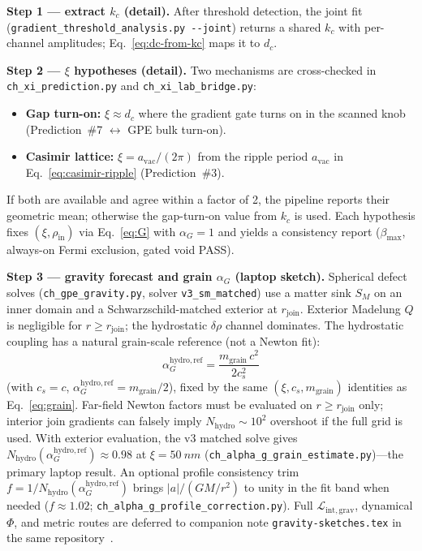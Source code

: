 \documentclass[11pt,a4paper]{article}
\newcommand{\py}[1]{\nolinkurl{#1}}
\begin{document}
\textbf{Step 1 --- extract $k_c$ (detail).}
After threshold detection, the joint fit (\py{gradient_threshold_analysis.py --joint}) returns a shared $k_c$ with per-channel amplitudes; Eq.~\ref{eq:dc-from-kc} maps it to $d_c$.

\textbf{Step 2 --- $\xi$ hypotheses (detail).}
Two mechanisms are cross-checked in \texttt{ch\_xi\_prediction.py} and \texttt{ch\_xi\_lab\_bridge.py}:
\begin{itemize}[leftmargin=*]
  \item \textbf{Gap turn-on:} $\xi \approx d_c$ where the gradient gate turns on in the scanned knob (Prediction~\#7 $\leftrightarrow$ GPE bulk turn-on).
  \item \textbf{Casimir lattice:} $\xi = a_{\mathrm{vac}}/(2\pi)$ from the ripple period $a_{\mathrm{vac}}$ in Eq.~\ref{eq:casimir-ripple} (Prediction~\#3).
\end{itemize}
If both are available and agree within a factor of 2, the pipeline reports their geometric mean; otherwise the gap-turn-on value from $k_c$ is used.
Each hypothesis fixes $(\xi, \rho_{\mathrm{in}})$ via Eq.~\ref{eq:G} with $\alpha_G = 1$ and yields a consistency report ($\beta_{\max}$, always-on Fermi exclusion, gated void PASS).

\textbf{Step 3 --- gravity forecast and grain $\alpha_G$ (laptop sketch).}
Spherical defect solves (\texttt{ch\_gpe\_gravity.py}, solver \texttt{v3\_sm\_matched}) use a matter sink $S_M$ on an inner domain and a Schwarzschild-matched exterior at $r_{\mathrm{join}}$.
Exterior Madelung $Q$ is negligible for $r \geq r_{\mathrm{join}}$; the hydrostatic $\delta\rho$ channel dominates.
The hydrostatic coupling has a natural grain-scale reference (not a Newton fit):
\begin{equation}
  \alpha_G^{\mathrm{hydro,ref}} = \frac{m_{\mathrm{grain}}\, c^2}{2 c_s^2}
  \label{eq:alpha-hydro-ref}
\end{equation}
(with $c_s=c$, $\alpha_G^{\mathrm{hydro,ref}} = m_{\mathrm{grain}}/2$), fixed by the same $(\xi, c_s, m_{\mathrm{grain}})$ identities as Eq.~\ref{eq:grain}.
Far-field Newton factors must be evaluated on $r \geq r_{\mathrm{join}}$ only; interior join gradients can falsely imply $N_{\mathrm{hydro}} \sim 10^2$ overshoot if the full grid is used.
With exterior evaluation, the v3 matched solve gives $N_{\mathrm{hydro}}(\alpha_G^{\mathrm{hydro,ref}}) \approx 0.98$ at $\xi = \SI{50}{nm}$ (\texttt{ch\_alpha\_g\_grain\_estimate.py})---the primary laptop result.
An optional profile consistency trim $f = 1/N_{\mathrm{hydro}}(\alpha_G^{\mathrm{hydro,ref}})$ brings $|a|/(GM/r^2)$ to unity in the fit band when needed ($f \approx 1.02$; \texttt{ch\_alpha\_g\_profile\_correction.py}).
Full $\mathcal{L}_{\mathrm{int,grav}}$, dynamical $\Phi$, and metric routes are deferred to companion note \texttt{gravity-sketches.tex} in the same repository~\cite{CHSpaceFabric2026}.
\end{document}
